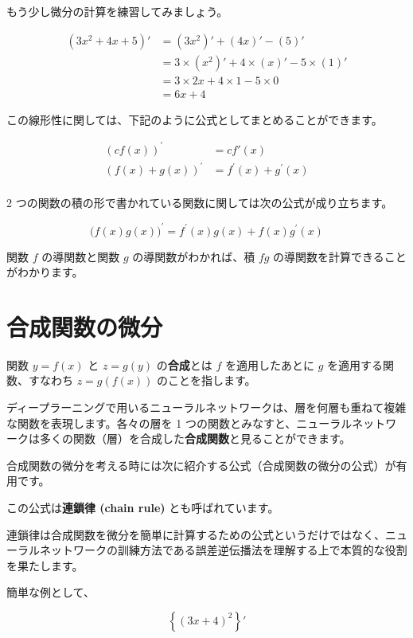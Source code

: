 もう少し微分の計算を練習してみましょう。


\[
\begin{aligned}
\left( 3x^{2} + 4x + 5 \right)' &= \left( 3x^{2} \right)' + \left( 4x \right)' - \left( 5 \right)' \\
&= 3 \times \left( x^{2} \right)' + 4 \times \left( x \right)' - 5 \times \left( 1 \right)' \\
&= 3 \times 2x + 4 \times 1 - 5 \times 0  \\
&= 6x + 4
\end{aligned}
\]


この線形性に関しては、下記のように公式としてまとめることができます。


\begin{align}
\left( cf(x) \right)^{'} &= c f'(x) \\
\left( f(x) + g(x) \right)^{'} &= f^{'}(x) + g^{'}(x) \\
\end{align}



2 つの関数の積の形で書かれている関数に関しては次の公式が成り立ちます。


\[
\bigl( f(x) g(x) \bigr)^{'} = f^{'}(x)g(x) + f(x)g^{'}(x)
\]


関数 $f$ の導関数と関数 $g$ の導関数がわかれば、積 $fg$ の導関数を計算できることがわかります。


\section{合成関数の微分}


関数 $y = f(x)$ と $z = g(y)$ の\textbf{合成}とは $f$ を適用したあとに $g$ を適用する関数、すなわち $z  = g(f(x))$ のことを指します。

ディープラーニングで用いるニューラルネットワークは、層を何層も重ねて複雑な関数を表現します。各々の層を 1 つの関数とみなすと、ニューラルネットワークは多くの関数（層）を合成した\textbf{合成関数}と見ることができます。

合成関数の微分を考える時には次に紹介する公式（合成関数の微分の公式）が有用です。

この公式は\textbf{連鎖律 (chain rule)} とも呼ばれています。

連鎖律は合成関数を微分を簡単に計算するための公式というだけではなく、ニューラルネットワークの訓練方法である誤差逆伝播法を理解する上で本質的な役割を果たします。


簡単な例として、


\[
\left\{ (3x + 4)^{2} \right\}'
\]


